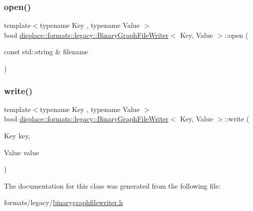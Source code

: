 \subsubsection{\texorpdfstring{open()}{open()}}
{\footnotesize\ttfamily template$<$typename Key , typename Value $>$ \\
bool \mbox{\hyperlink{classdisplace_1_1formats_1_1legacy_1_1_binary_graph_file_writer}{displace\+::formats\+::legacy\+::\+Binary\+Graph\+File\+Writer}}$<$ Key, Value $>$\+::open (\begin{DoxyParamCaption}\item[{const std\+::string \&}]{filename }\end{DoxyParamCaption})\hspace{0.3cm}{\ttfamily [inline]}}

\mbox{\label{classdisplace_1_1formats_1_1legacy_1_1_binary_graph_file_writer_ab0d6d7d7aa0130e3bff9930a15faee9a}} 
\subsubsection{\texorpdfstring{write()}{write()}}
{\footnotesize\ttfamily template$<$typename Key , typename Value $>$ \\
bool \mbox{\hyperlink{classdisplace_1_1formats_1_1legacy_1_1_binary_graph_file_writer}{displace\+::formats\+::legacy\+::\+Binary\+Graph\+File\+Writer}}$<$ Key, Value $>$\+::write (\begin{DoxyParamCaption}\item[{Key}]{key,  }\item[{Value}]{value }\end{DoxyParamCaption})\hspace{0.3cm}{\ttfamily [inline]}}



The documentation for this class was generated from the following file\+:\begin{DoxyCompactItemize}
\item 
formats/legacy/\mbox{\hyperlink{binarygraphfilewriter_8h}{binarygraphfilewriter.\+h}}\end{DoxyCompactItemize}
